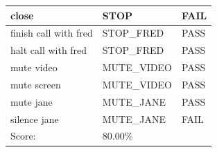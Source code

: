 \documentclass[11pt]{article}
\begin{document}
\begin{appendices}
\begin{table}[H]
\begin{tabular}{lll}
\multicolumn{1}{l|}{close}                          & \multicolumn{1}{l|}{STOP}               & \cellcolor[HTML]{FD6864}FAIL \\ \hline
\multicolumn{1}{l|}{finish call with fred}          & \multicolumn{1}{l|}{STOP\_FRED}         & \cellcolor[HTML]{67FD9A}PASS \\ \hline
\multicolumn{1}{l|}{halt call with fred}            & \multicolumn{1}{l|}{STOP\_FRED}         & \cellcolor[HTML]{67FD9A}PASS \\ \hline
\multicolumn{1}{l|}{mute video}                     & \multicolumn{1}{l|}{MUTE\_VIDEO}        & \cellcolor[HTML]{67FD9A}PASS \\ \hline
\multicolumn{1}{l|}{mute screen}                    & \multicolumn{1}{l|}{MUTE\_VIDEO}        & \cellcolor[HTML]{67FD9A}PASS \\ \hline
\multicolumn{1}{l|}{mute jane}                      & \multicolumn{1}{l|}{MUTE\_JANE}         & \cellcolor[HTML]{67FD9A}PASS \\ \hline
\multicolumn{1}{l|}{silence jane}                   & \multicolumn{1}{l|}{MUTE\_JANE}         & \cellcolor[HTML]{FD6864}FAIL \\ \hline
\multicolumn{1}{l|}{Score:}                         & \multicolumn{1}{l|}{80.00\%}            &                              \\
\end{tabular}
\end{table}



\end{appendices}
\end{document}
